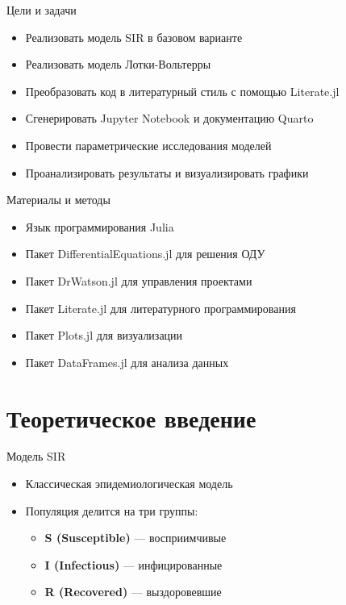 \documentclass[
  ignorenonframetext,
  aspectratio=169,
  russian,
]{beamer}
\providecommand{\tightlist}{%
  \setlength{\itemsep}{0pt}\setlength{\parskip}{0pt}}\usepackage{longtable,booktabs,array}
\begin{document}
\begin{frame}{Цели и задачи}
\label{ux446ux435ux43bux438-ux438-ux437ux430ux434ux430ux447ux438}
\begin{itemize}[<+->]
\tightlist
\item
  Реализовать модель SIR в базовом варианте
\item
  Реализовать модель Лотки-Вольтерры
\item
  Преобразовать код в литературный стиль с помощью Literate.jl
\item
  Сгенерировать Jupyter Notebook и документацию Quarto
\item
  Провести параметрические исследования моделей
\item
  Проанализировать результаты и визуализировать графики
\end{itemize}
\end{frame}

\begin{frame}{Материалы и методы}
\label{ux43cux430ux442ux435ux440ux438ux430ux43bux44b-ux438-ux43cux435ux442ux43eux434ux44b}
\begin{itemize}[<+->]
\tightlist
\item
  Язык программирования Julia
\item
  Пакет DifferentialEquations.jl для решения ОДУ
\item
  Пакет DrWatson.jl для управления проектами
\item
  Пакет Literate.jl для литературного программирования
\item
  Пакет Plots.jl для визуализации
\item
  Пакет DataFrames.jl для анализа данных
\end{itemize}
\end{frame}

\section{Теоретическое
введение}\label{ux442ux435ux43eux440ux435ux442ux438ux447ux435ux441ux43aux43eux435-ux432ux432ux435ux434ux435ux43dux438ux435}

\begin{frame}{Модель SIR}
\label{ux43cux43eux434ux435ux43bux44c-sir}
\begin{itemize}[<+->]
\tightlist
\item
  Классическая эпидемиологическая модель
\item
  Популяция делится на три группы:

  \begin{itemize}[<+->]
  \tightlist
  \item
    \textbf{S (Susceptible)} --- восприимчивые
  \item
    \textbf{I (Infectious)} --- инфицированные
  \item
    \textbf{R (Recovered)} --- выздоровевшие
  \end{itemize}
\end{itemize}
\end{frame}
\end{document}
